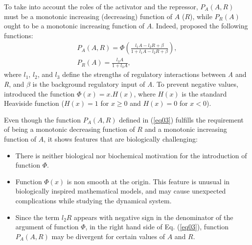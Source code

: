 \documentclass[11pt]{article}
\begin{document}
	To take into account the roles of the activator and the repressor, $P_A(A, R)$
	must be a monotonic increasing (decreasing) function of $A$ ($R$), while
	$P_R(A)$ ought to be a monotonic increasing function of $A$. Indeed,
	\citet{Cotterell2015} proposed the following functions:
	\begin{subequations}\label{eq034}
		\begin{gather}
		P_A(A, R) = \displaystyle \Phi \left(
		\frac{l_1 A - l_2 R + \beta}{1 + l_1 A - l_2 R + \beta}
		\right), \label{eq03} \\[3mm]
		P_R(A) = \displaystyle \frac{l_3 A}{1 + l_3 A}, \label{eq04}
		\end{gather}
	\end{subequations}
	where $l_1$, $l_2$, and $l_3$ define the strengths of regulatory interactions
	between \textit{A} and \textit{R}, and $\beta$ is the background regulatory
	input of \textit{A}. To prevent negative values, \citeauthor{Cotterell2015}
	introduced the function $\Phi(x) = x.H(x)$, where $H(x)$ is the standard
	Heaviside function ($H(x) = 1$ for $x \geq 0$ and $H(x) = 0$ for $x < 0$).
	
	Even though the function $P_A(A, R)$ defined in (\ref{eq03}) fulfills the
	requirement of being a monotonic decreasing function of $R$ and a monotonic
	increasing function of $A$, it shows features that are biologically challenging:
	\begin{itemize}
		\item There is neither biological nor biochemical motivation for the introduction of function
		$\Phi$.
		\item Function $\Phi(x)$ is non smooth at the origin. This feature is
		unusual in biologically inspired mathematical models, and may cause unexpected
		complications while studying the dynamical system.
		\item Since the term $l_2 R$ appears with negative sign in the denominator of
		the argument of function $\Phi$, in the right hand side of Eq. (\ref{eq03}),
		function $P_A(A, R)$ may be divergent for certain values of $A$ and $R$.
	\end{itemize}
	
\end{document}
